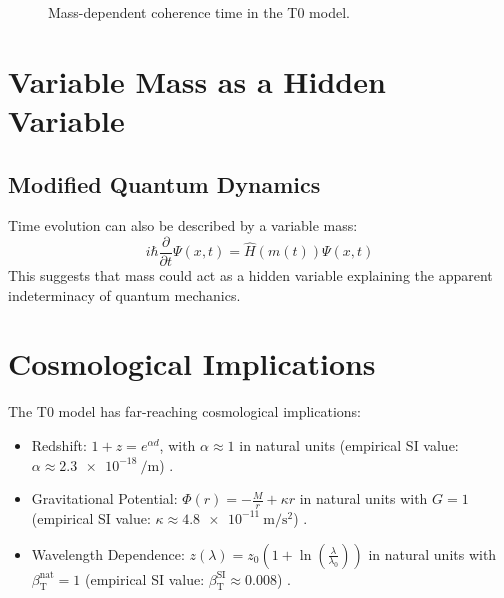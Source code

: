 \documentclass[12pt,a4paper]{article}
\newcommand{\betaT}{\beta_{\text{T}}}
\begin{document}
	\begin{figure}[h]
		\centering
		\caption{Mass-dependent coherence time in the T0 model.}
	\end{figure}
	
	\section{Variable Mass as a Hidden Variable}
	\subsection{Modified Quantum Dynamics}
	Time evolution can also be described by a variable mass:
	\begin{equation}
		i\hbar \frac{\partial}{\partial t}\Psi(x,t) = \hat{H}(m(t))\Psi(x,t)
	\end{equation}
	This suggests that mass could act as a hidden variable explaining the apparent indeterminacy of quantum mechanics.
	\section{Cosmological Implications}
The T0 model has far-reaching cosmological implications:
\begin{itemize}
	\item Redshift: \( 1 + z = e^{\alpha d} \), with \(\alpha \approx 1\) in natural units (empirical SI value: \(\alpha \approx \SI{2.3e-18}{\per\meter}\)) \cite{pascher_lagrange_2025}.
	\item Gravitational Potential: \(\Phi(r) = -\frac{M}{r} + \kappa r\) in natural units with \(G = 1\) (empirical SI value: \(\kappa \approx \SI{4.8e-11}{\meter\per\second\squared}\)) \cite{pascher_lagrange_2025}.
	\item Wavelength Dependence: \( z(\lambda) = z_0 \left(1 + \ln\left(\frac{\lambda}{\lambda_0}\right)\right) \) in natural units with \(\betaT^{\text{nat}} = 1\) (empirical SI value: \(\betaT^{\text{SI}} \approx 0.008\)) \cite{pascher_params_2025}.
\end{itemize}
\end{document}
